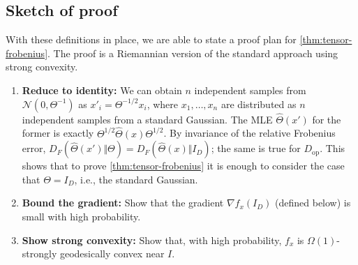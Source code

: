\documentclass[aos]{imsart}
\theoremstyle{definition}
\numberwithin{equation}{section}
\DeclareMathOperator{\op}{op}
\renewcommand{\P}{{\mathbb{P}}}
\newcommand{\cN}{\mathcal{N}}
\newcommand{\samp}{x}
\begin{document}
\subsection{Sketch of proof}\label{subsec:proof-sketch}







With these definitions in place, we are able to state a proof plan for \cref{thm:tensor-frobenius}. The proof is a Riemannian version of the standard approach using strong convexity.

\begin{enumerate}
\item\label{it:reduce}
\textbf{Reduce to identity:}
We can obtain $n$ independent samples from $\cN(0, \Theta^{-1})$ as $x'_i = \Theta^{-1/2} x_i$, where $x_1,\dots,x_n$ are distributed as $n$ independent samples from a standard Gaussian.
The MLE $\widehat{\Theta}(x')$ for the former is exactly $\Theta^{1/2} \widehat{\Theta}(x) \Theta^{1/2}$.
By invariance of the relative Frobenius error, $D_F(\widehat\Theta(x') \Vert \Theta) = D_F(\widehat\Theta(x) \Vert I_D)$; the same is true for $D_{\op}$.
This shows that to prove \cref{thm:tensor-frobenius} it is enough to consider the case that $\Theta = I_D$, i.e., the standard Gaussian.
\item\label{it:grad} \textbf{Bound the gradient:}
Show that the gradient $\nabla f_x(I_D)$ (defined below) is small with high probability.
\item\label{it:convexity} \textbf{Show strong convexity:}
Show that, with high probability, $f_x$ is $\Omega(1)$-strongly geodesically convex near $I$.
\end{enumerate}
\end{document}
